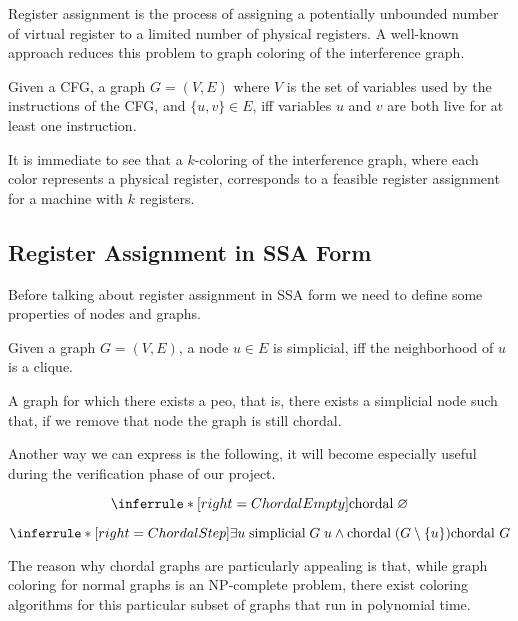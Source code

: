 Register assignment is the process of assigning a potentially unbounded number of virtual register to a limited number of physical registers. A well-known approach reduces this problem to graph coloring of the interference graph.

\begin{definition}\label{def:ig}
    Given a CFG, a graph $G = (V, E)$ where $V$ is the set of variables used by the instructions of the CFG, and $\{ u, v \} \in E$, iff variables $u$ and $v$ are both live for at least one instruction.
\end{definition}

It is immediate to see that a $k$-coloring of the interference graph, where each color represents a physical register, corresponds to a feasible register assignment for a machine with $k$ registers.

\subsection{Register Assignment in SSA Form}
\label{subsec:ssara}

Before talking about register assignment in SSA form we need to define some properties of nodes and graphs.

\begin{definition}\label{def:simplicial}
    Given a graph $G = (V, E)$, a node $u \in E$ is simplicial, iff the neighborhood of $u$ is a clique.
\end{definition}

\begin{definition}\label{def:chordal}
    A graph for which there exists a \gls{peo}, that is, there exists a simplicial node such that, if we remove that node the graph is still chordal.
\end{definition}

Another way we can express  is the following, it will become especially useful during the verification phase of our project.

\[
\inferrule*[right=ChordalEmpty]{
}{
    \text{chordal} \; \varnothing
}
\]

\[
\inferrule*[right=ChordalStep]{
    \exists u \; \text{simplicial} \; G \; u \land
    \text{chordal} \; (G \setminus \{ u \})
}{
    \text{chordal } G
}
\]

The reason why chordal graphs are particularly appealing is that, while graph coloring for normal graphs is an NP-complete problem, there exist coloring algorithms for this particular subset of graphs that run in polynomial time.

